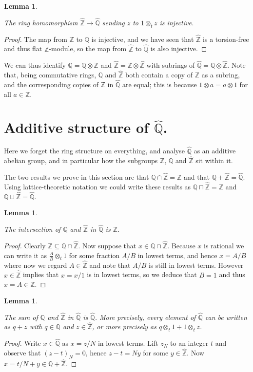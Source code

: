 \documentclass[10pt,a4paper]{article}
\newcommand{\Z}{\mathbb{Z}}
\newcommand{\Q}{\mathbb{Q}}
\newcommand{\Qhat}{\widehat{\Q}}
\newcommand{\Zhat}{\widehat{\Z}}
\newtheorem{lemma}[theorem]{Lemma}
\newcommand{\uses}[1]{}
\newcommand{\lean}[1]{}
\newcommand{\leanok}{}
\begin{document}
\begin{lemma}
    \label{QHat.injective_zHat}
    \lean{QHat.injective_zHat}
    \uses{QHat, ZHat.torsionfree}
    \leanok
    The ring homomorphism $\Zhat\to\Qhat$ sending
    $z$ to $1\otimes_t z$ is injective.
\end{lemma}
\begin{proof} \leanok
    The map from $\Z$ to $\Q$ is injective, and we have seen
    that $\Zhat$ is a torsion-free and thus flat $\Z$-module,
    so the map from $\Zhat$ to $\Qhat$ is also injective.
\end{proof}

We can thus identify $\Q=\Q\otimes\Z$ and $\Zhat=\Z\otimes\Zhat$ with subrings of $\Qhat=\Q\otimes\Zhat$.
Note that, being commutative rings, $\Q$ and $\Zhat$ both contain a copy of $\Z$ as a subring, and
the corresponding copies of $\Z$ in $\Qhat$ are equal; this is because $1\otimes a=a\otimes 1$
for all $a\in\Z$.

\section{Additive structure of \texorpdfstring{$\Qhat$}{Qhat}.}

Here we forget the ring structure on everything, and analyse $\Qhat$ as an additive
abelian group, and in particular how the subgroups $\Z$, $\Q$ and $\Zhat$ sit within it.

The two results we prove in this section are that $\Q\cap\Zhat=\Z$ and
that $\Q+\Zhat=\Qhat$. Using lattice-theoretic notation we could write
these results as $\Q\sqcap\Zhat=\Z$ and $\Q\sqcup\Zhat=\Qhat$.

\begin{lemma}
    \label{QHat.rat_meet_zHat}
    \lean{QHat.rat_meet_zHat}
    \uses{QHat,ZHat.commRing}
    \leanok
    The intersection of $\Q$ and $\Zhat$ in $\Qhat$ is $\Z$.
\end{lemma}
\begin{proof}
    \uses{QHat.lowestTerms}
    \leanok
    Clearly $\Z\subseteq\Q\cap\Zhat$. Now suppose that $x\in\Q\cap\Zhat$.
    Because $x$ is rational we can write it as $\frac{A}{B}\otimes_t1$ for some
    fraction $A/B$ in lowest terms, and hence $x=A/B$ where now we regard $A\in\Zhat$
    and note that $A/B$ is still in lowest terms. However $x\in\Zhat$ implies that
    $x=x/1$ is in lowest terms, so we deduce that $B=1$ and thus $x=A\in\Z$.
\end{proof}

\begin{lemma}
    \label{QHat.rat_join_zHat}
    \lean{QHat.rat_join_zHat}
    \uses{QHat,ZHat.commRing}
    \leanok
    The sum of $\Q$ and $\Zhat$ in $\Qhat$ is $\Qhat$.
    More precisely, every element of $\Qhat$ can be written as $q+z$ with $q\in\Q$ and $z\in\Zhat$,
    or more precisely as $q\otimes_t 1+1\otimes_t z$.
\end{lemma}
\begin{proof}
    \uses{QHat.canonicalForm}
    \leanok
    Write $x\in\Qhat$ as $x=z/N$ in lowest terms. Lift $z_N$ to an integer $t$ and observe
    that $(z-t)_N=0$, hence $z-t=Ny$ for some $y\in\Zhat$. Now $x=t/N+y\in\Q+\Zhat$.
\end{proof}
\end{document}
